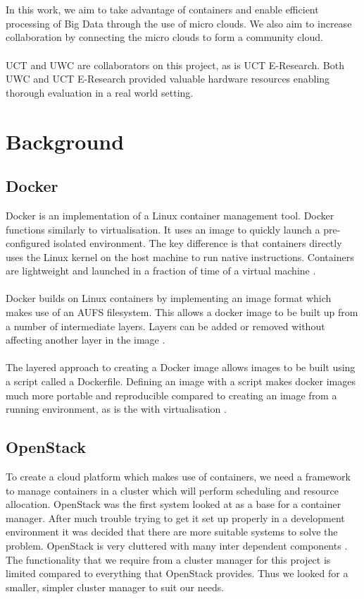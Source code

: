 \documentclass{sig-alternate-05-2015}
\begin{document}
\\\\
In this work, we aim to take advantage of containers and enable efficient processing of Big Data through the use of micro clouds. We also aim to increase collaboration by connecting the micro clouds to form a community cloud.
\\\\
UCT and UWC are collaborators on this project, as is UCT E-Research. Both UWC and UCT E-Research provided valuable hardware resources enabling thorough evaluation in a real world setting.


\section{Background}

\subsection{Docker}
Docker is an implementation of a Linux container management tool. Docker functions similarly to virtualisation. It uses an image to quickly launch a pre-configured isolated environment. The key difference is that containers directly uses the Linux kernel on the host machine to run native instructions. Containers are lightweight and launched in a fraction of time of a virtual machine \cite{joy2015performance}. 
\\\\
Docker builds on Linux containers by implementing an image format which makes use of an AUFS filesystem. This allows a docker image to be built up from a number of intermediate layers. Layers can be added or removed without affecting another layer in the image \cite{boettiger2014introduction}.
\\\\
The layered approach to creating a Docker image allows images to be built using a script called a Dockerfile. Defining an image with a script makes docker images much more portable and reproducible compared to creating an image from a running environment, as is the with virtualisation \cite{boettiger2014introduction}.

\subsection{OpenStack}
To create a cloud platform which makes use of containers, we need a framework to manage containers in a cluster which will perform scheduling and resource allocation. OpenStack was the first system looked at as a base for a container manager. After much trouble trying to get it set up properly in a development environment it was decided that there are more suitable systems to solve the problem. OpenStack is very cluttered with many inter dependent components \cite{affetti2015adock}. The functionality that we require from a cluster manager for this project is limited compared to everything that OpenStack provides. Thus we looked for a smaller, simpler cluster manager to suit our needs.
\end{document}
